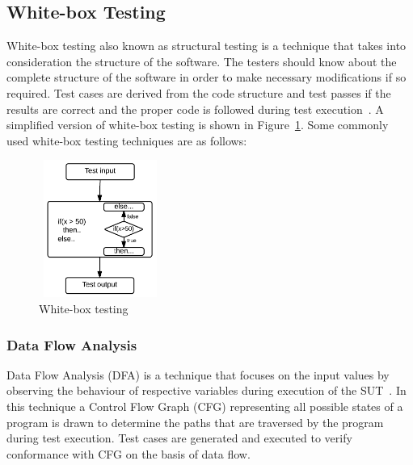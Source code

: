 \subsection{White-box Testing}
White-box testing also known as structural testing is a technique that takes into consideration the structure of the software. The testers should know about the complete structure of the software in order to make necessary modifications if so required. Test cases are derived from the code structure and test passes if the results are correct  and the proper code is followed during test execution~\cite{ostrand2002white}. A simplified version of white-box testing is shown in Figure~\ref{fig:whiteBox}. Some commonly used white-box testing techniques are as follows:

\bigskip
\begin{figure}[H]
\begin{center}
	\includegraphics[width=4cm, height=4.5cm ]{chapter2/whiteBox.png}
	\bigskip
	\caption{White-box testing}
	\label{fig:whiteBox}
\end{center}  
\end{figure}

\subsubsection{Data Flow Analysis}
Data Flow Analysis (DFA) is a technique that focuses on the input values by observing the behaviour of respective variables during execution of the SUT~\cite{clarke1989formal}. In this technique a Control Flow Graph (CFG) representing all possible states of a program is drawn to determine the paths that are traversed by the program during test execution. Test cases are generated and executed to verify conformance with CFG on the basis of data flow. 

